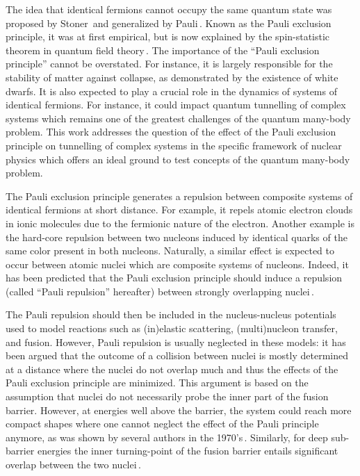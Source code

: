 The idea that identical fermions cannot occupy the same quantum state was proposed by 
Stoner\,\citep{stoner1924} and  generalized by Pauli\,\citep{pauli1925}. Known as the Pauli exclusion 
principle, it was at first empirical, but is now  explained by the spin-statistic theorem in quantum 
field theory\,\citep{fierz1939,pauli1940}. The importance of the ``Pauli exclusion principle'' cannot 
be overstated. For instance, it is largely responsible for the stability of matter against collapse, 
as demonstrated by the existence of white dwarfs. It is also expected to play a crucial role 
in the dynamics of  systems of identical fermions. 
For instance, it could   impact quantum tunnelling of complex systems which remains 
one of the greatest challenges of the quantum many-body problem. 
This work addresses the question of the effect of the Pauli exclusion principle on tunnelling 
of complex systems in the specific framework of nuclear physics which offers an ideal ground 
to test concepts of the quantum many-body problem.

The Pauli exclusion principle generates a repulsion between composite systems 
of identical fermions at short distance.
For example, it repels atomic electron clouds in ionic molecules due to the fermionic nature of the electron.
Another example is the hard-core repulsion between two nucleons induced 
by identical quarks of the same color present in both nucleons.
Naturally, a similar effect is expected to occur between atomic nuclei which are composite systems of nucleons.
Indeed, it has been predicted that the Pauli exclusion principle should induce a repulsion 
(called ``Pauli repulsion'' hereafter) between strongly overlapping nuclei\,\citep{fliessbach1971}.

The Pauli repulsion should then be included in the nucleus-nucleus potentials used
to model reactions such as (in)elastic scattering, (multi)nucleon transfer, and fusion.
However, Pauli repulsion is usually neglected in these models:
it has been argued that the outcome of a collision between nuclei is mostly determined
at a  distance where the nuclei do not overlap much 
and thus the effects of the Pauli exclusion principle are minimized.
This argument is based on the assumption that nuclei do not necessarily probe
the inner part of the fusion barrier.
However, at energies well above the barrier, the system could reach more compact shapes
where one cannot neglect the effect of the Pauli principle anymore,
as was shown by several authors in the 1970's\,\citep{fliessbach1971,brink1975,zint1975,beck1978,sinha1979}.
Similarly, for deep sub-barrier energies the inner turning-point of the fusion barrier entails significant overlap
between the two nuclei\,\citep{dasso2003,umar2012a}.

